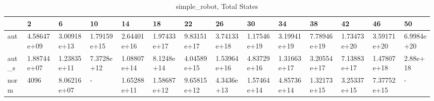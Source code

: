 \begin{table}
\caption{simple_robot, Total States}
\label{simple_robot_total}
\begin{tabular}{llllllllllllll}
\toprule
 & 2 & 6 & 10 & 14 & 18 & 22 & 26 & 30 & 34 & 38 & 42 & 46 & 50 \\
\midrule
aut & 4.58647e+09 & 3.00918e+13 & 1.79159e+15 & 2.64401e+16 & 1.97433e+17 & 9.83151e+17 & 3.74133e+18 & 1.17546e+19 & 3.19941e+19 & 7.78946e+19 & 1.73473e+20 & 3.59171e+20 & 6.9984e+20 \\
aut_s & 1.88744e+07 & 1.23835e+11 & 7.3728e+12 & 1.08807e+14 & 8.1248e+14 & 4.04589e+15 & 1.53964e+16 & 4.83729e+16 & 1.31663e+17 & 3.20554e+17 & 7.13883e+17 & 1.47807e+18 & 2.88e+18 \\
norm & 4096 & 8.06216e+07 & - & 1.65288e+11 & 1.58687e+12 & 9.65815e+12 & 4.3436e+13 & 1.57464e+14 & 4.85736e+14 & 1.32173e+15 & 3.25337e+15 & 7.37752e+15 & - \\
\bottomrule
\end{tabular}
\end{table}
